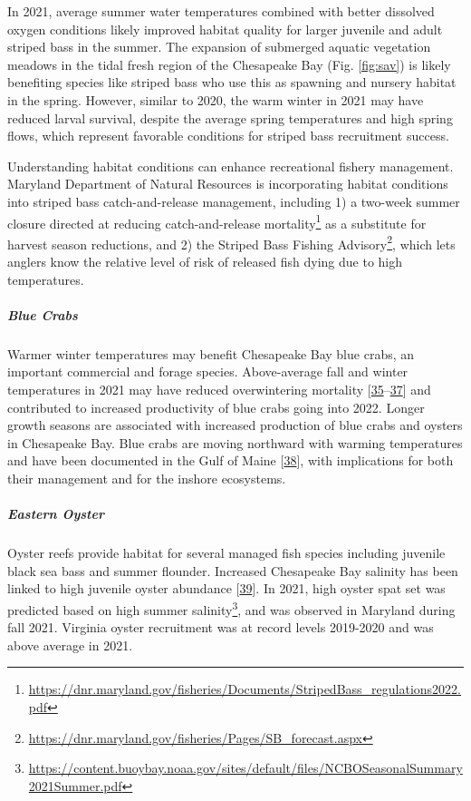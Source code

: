 \documentclass[
  10pt,
]{article}
\begin{document}
In 2021, average summer water temperatures combined with better
dissolved oxygen conditions likely improved habitat quality for larger
juvenile and adult striped bass in the summer. The expansion of
submerged aquatic vegetation meadows in the tidal fresh region of the
Chesapeake Bay (Fig. \ref{fig:sav}) is likely benefiting species like
striped bass who use this as spawning and nursery habitat in the spring.
However, similar to 2020, the warm winter in 2021 may have reduced
larval survival, despite the average spring temperatures and high spring
flows, which represent favorable conditions for striped bass recruitment
success.

Understanding habitat conditions can enhance recreational fishery
management. Maryland Department of Natural Resources is incorporating
habitat conditions into striped bass catch-and-release management,
including 1) a two-week summer closure directed at reducing
catch-and-release mortality\footnote{\url{https://dnr.maryland.gov/fisheries/Documents/StripedBass_regulations2022.pdf}}
as a substitute for harvest season reductions, and 2) the Striped Bass
Fishing Advisory\footnote{\url{https://dnr.maryland.gov/fisheries/Pages/SB_forecast.aspx}},
which lets anglers know the relative level of risk of released fish
dying due to high temperatures.

\hypertarget{blue-crabs}{%
\subparagraph{\texorpdfstring{\emph{Blue
Crabs}}{Blue Crabs}}\label{blue-crabs}}

Warmer winter temperatures may benefit Chesapeake Bay blue crabs, an
important commercial and forage species. Above-average fall and winter
temperatures in 2021 may have reduced overwintering mortality
{[}\protect\hyperlink{ref-bauer_temperature-_2010}{35}--\protect\hyperlink{ref-rome_linking_2005}{37}{]}
and contributed to increased productivity of blue crabs going into 2022.
Longer growth seasons are associated with increased production of blue
crabs and oysters in Chesapeake Bay. Blue crabs are moving northward
with warming temperatures and have been documented in the Gulf of Maine
{[}\protect\hyperlink{ref-johnson_savory_2015}{38}{]}, with implications
for both their management and for the inshore ecosystems.

\hypertarget{eastern-oyster}{%
\subparagraph{\texorpdfstring{\emph{Eastern
Oyster}}{Eastern Oyster}}\label{eastern-oyster}}

Oyster reefs provide habitat for several managed fish species including
juvenile black sea bass and summer flounder. Increased Chesapeake Bay
salinity has been linked to high juvenile oyster abundance
{[}\protect\hyperlink{ref-kimmel_relationship_2014}{39}{]}. In 2021,
high oyster spat set was predicted based on high summer
salinity\footnote{\url{https://content.buoybay.noaa.gov/sites/default/files/NCBOSeasonalSummary2021Summer.pdf}},
and was observed in Maryland during fall 2021. Virginia oyster
recruitment was at record levels 2019-2020 and was above average in
2021.
\end{document}
